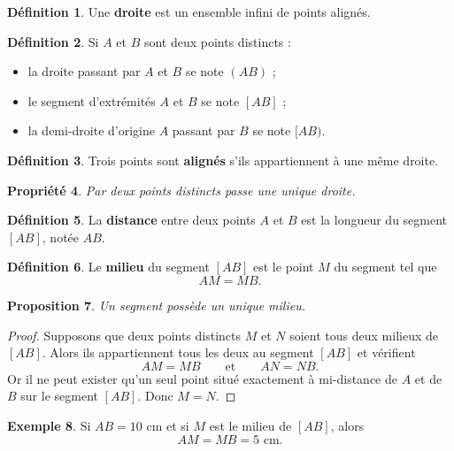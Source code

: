 \documentclass[11pt,a4paper]{article}
\theoremstyle{definition}
\newtheorem{definition}{Définition}[section]
\newtheorem{exemple}[definition]{Exemple}
\theoremstyle{plain}
\newtheorem{propriete}[definition]{Propriété}
\newtheorem{proposition}[definition]{Proposition}
\begin{document}
\begin{definition}
Une \textbf{droite} est un ensemble infini de points alignés.
\end{definition}

\begin{definition}
Si $A$ et $B$ sont deux points distincts :
\begin{itemize}
    \item la droite passant par $A$ et $B$ se note $(AB)$ ;
    \item le segment d'extrémités $A$ et $B$ se note $[AB]$ ;
    \item la demi-droite d'origine $A$ passant par $B$ se note $[AB)$.
\end{itemize}
\end{definition}

\begin{definition}
Trois points sont \textbf{alignés} s'ils appartiennent à une même droite.
\end{definition}

\begin{propriete}
Par deux points distincts passe une unique droite.
\end{propriete}

\begin{definition}
La \textbf{distance} entre deux points $A$ et $B$ est la longueur du segment $[AB]$, notée $AB$.
\end{definition}

\begin{definition}
Le \textbf{milieu} du segment $[AB]$ est le point $M$ du segment tel que
\[
AM=MB.
\]
\end{definition}

\begin{proposition}
Un segment possède un unique milieu.
\end{proposition}

\begin{proof}
Supposons que deux points distincts $M$ et $N$ soient tous deux milieux de $[AB]$.
Alors ils appartiennent tous les deux au segment $[AB]$ et vérifient
\[
AM=MB \qquad \text{et} \qquad AN=NB.
\]
Or il ne peut exister qu'un seul point situé exactement à mi-distance de $A$ et de $B$ sur le segment $[AB]$.
Donc $M=N$.
\end{proof}

\begin{exemple}
Si $AB=10$ cm et si $M$ est le milieu de $[AB]$, alors
\[
AM=MB=5 \text{ cm}.
\]
\end{exemple}
\end{document}
